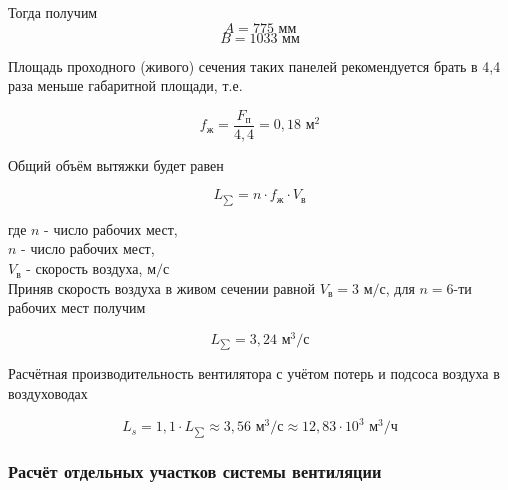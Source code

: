 Тогда получим
$$
    A = 775 \text{ мм}
$$
$$
    B = 1033 \text{ мм}
$$


Площадь проходного (живого) сечения таких панелей рекомендуется брать в 4,4
раза меньше габаритной площади, т.е.

\begin{equation}
\label{alive_section_are}
    f_\text{ж} = \frac{F_\text{п}}{4,4} = 0,18 \text{ м}^2
\end{equation}

Общий объём вытяжки будет равен

\begin{equation}
\label{overall_sucktion_volume}
    L_{\sum} = n \cdot f_\text{ж} \cdot V_\text{в}
\end{equation}

где $n$ - число рабочих мест,                   \\
$n$ - число рабочих мест,                       \\
$V_\text{в}$ - скорость воздуха, $\text{м/с}$   \\

Приняв скорость воздуха в живом сечении равной $V_\text{в} = 3 \text{ м/с}$,
для $n = 6$-ти рабочих мест получим

$$
    L_{\sum} = 3,24 \text{ м}^3 / \text{с}
$$

Расчётная производительность вентилятора с учётом потерь и подсоса воздуха
в воздуховодах

\begin{equation}
\label{fan_productivity}
    L_s = 1,1 \cdot L_{\sum}
        \approx 3,56 \text{ м}^3 / \text{с}
        \approx 12,83 \cdot 10^3 \text{ м}^3 / \text{ч}
\end{equation}

\subsubsection{Расчёт отдельных участков системы вентиляции}

